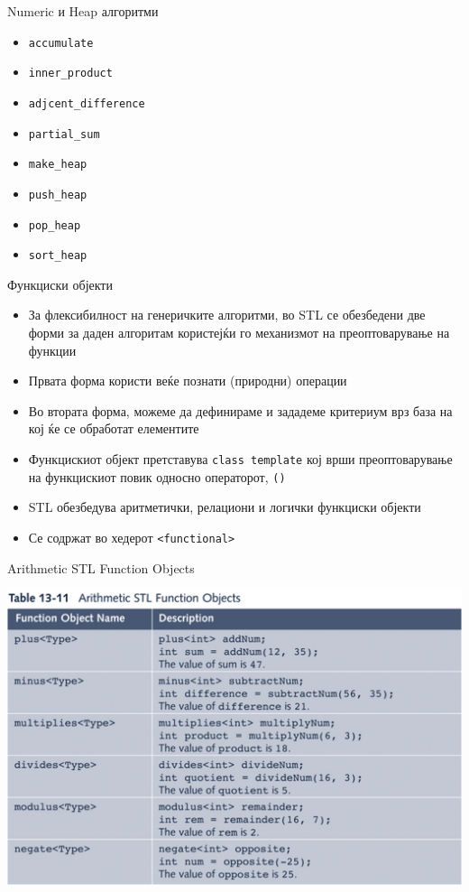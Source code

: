 \begin{frame}{Numeric и Heap алгоритми}
\begin{itemize}
  \item \texttt{accumulate}
  \item \texttt{inner\_product}
  \item \texttt{adjcent\_difference}
  \item \texttt{partial\_sum}
  \item \texttt{make\_heap}
  \item \texttt{push\_heap}
  \item \texttt{pop\_heap}
  \item \texttt{sort\_heap}
\end{itemize}
\end{frame}

\begin{frame}{Функциски објекти}
\begin{itemize}
  \item За флексибилност на генеричките алгоритми, во STL се обезбедени две
  форми за даден алгоритам користејќи го механизмот на преоптоварување на
  функции
  \item Првата форма користи веќе познати (природни) операции
  \item Во втората форма, можеме да дефинираме и зададеме критериум врз база на
  кој ќе се обработат елементите
  \item Функцискиот објект претставува \texttt{class template} кој врши преоптоварување
  на функцискиот повик односно операторот, \texttt{()}
  \item STL обезбедува аритметички, релациони и логички функциски објекти
  \item Се содржат во хедерот \texttt{<functional>}
\end{itemize}
\end{frame}

\begin{frame}{Arithmetic STL Function Objects}
\begin{center}
\includegraphics[width=\textwidth]{images/fo1}
\end{center}
\end{frame}

